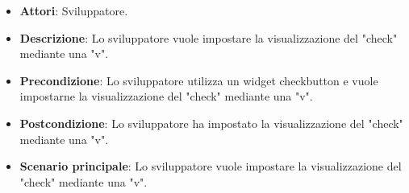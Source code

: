 
\FloatBarrier
\begin{itemize}
\item\textbf{Attori}: Sviluppatore.
\item\textbf{Descrizione}: Lo sviluppatore vuole impostare la visualizzazione del "check" mediante una "v".
\item\textbf{Precondizione}: Lo sviluppatore utilizza un widget checkbutton e vuole impostarne la visualizzazione del "check" mediante una "v".
\item\textbf{Postcondizione}: Lo sviluppatore ha impostato la visualizzazione del "check" mediante una "v".
\item\textbf{Scenario principale}: Lo sviluppatore vuole impostare la visualizzazione del "check" mediante una "v".
\end{itemize}
